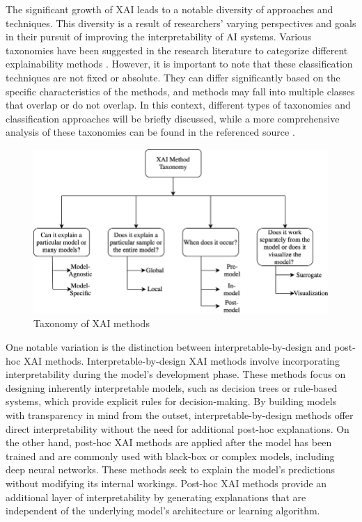 The significant growth of XAI leads to a notable diversity of approaches and techniques. This diversity is a result of researchers' varying perspectives and goals in their pursuit of improving the interpretability of AI systems. Various taxonomies have been suggested in the research literature to categorize different explainability methods \cite{taxonomy, medicalXAI}. However, it is important to note that these classification techniques are not fixed or absolute. They can differ significantly based on the specific characteristics of the methods, and methods may fall into multiple classes that overlap or do not overlap. In this context, different types of taxonomies and classification approaches will be briefly discussed, while a more comprehensive analysis of these taxonomies can be found in the referenced source \cite{taxonomy}.
\begin{figure}
\centering
\includegraphics[width=13cm]{images/xai_methods/taxonomy-of-XAI-methods.png}
\caption{Taxonomy of XAI methods \cite{taxonomy}}
\end{figure}

One notable variation is the distinction between interpretable-by-design and post-hoc XAI methods. Interpretable-by-design XAI methods involve incorporating interpretability during the model's development phase. These methods focus on designing inherently interpretable models, such as decision trees or rule-based systems, which provide explicit rules for decision-making. By building models with transparency in mind from the outset, interpretable-by-design methods offer direct interpretability without the need for additional post-hoc explanations. On the other hand, post-hoc XAI methods are applied after the model has been trained and are commonly used with black-box or complex models, including deep neural networks. These methods seek to explain the model's predictions without modifying its internal workings. Post-hoc XAI methods provide an additional layer of interpretability by generating explanations that are independent of the underlying model's architecture or learning algorithm.


